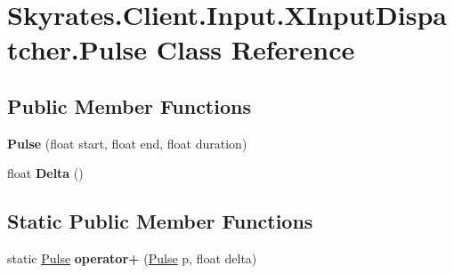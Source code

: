 \hypertarget{class_skyrates_1_1_client_1_1_input_1_1_x_input_dispatcher_1_1_pulse}{\section{Skyrates.\-Client.\-Input.\-X\-Input\-Dispatcher.\-Pulse Class Reference}
\label{class_skyrates_1_1_client_1_1_input_1_1_x_input_dispatcher_1_1_pulse}
}
\subsection*{Public Member Functions}
\begin{DoxyCompactItemize}
\item 
\hypertarget{class_skyrates_1_1_client_1_1_input_1_1_x_input_dispatcher_1_1_pulse_abf14fbb7ce803f1dd780a0671734487f}{{\bfseries Pulse} (float start, float end, float duration)}\label{class_skyrates_1_1_client_1_1_input_1_1_x_input_dispatcher_1_1_pulse_abf14fbb7ce803f1dd780a0671734487f}

\item 
\hypertarget{class_skyrates_1_1_client_1_1_input_1_1_x_input_dispatcher_1_1_pulse_ae679dbddb9756d6b224c1ec0ba0d591a}{float {\bfseries Delta} ()}\label{class_skyrates_1_1_client_1_1_input_1_1_x_input_dispatcher_1_1_pulse_ae679dbddb9756d6b224c1ec0ba0d591a}

\end{DoxyCompactItemize}
\subsection*{Static Public Member Functions}
\begin{DoxyCompactItemize}
\item 
\hypertarget{class_skyrates_1_1_client_1_1_input_1_1_x_input_dispatcher_1_1_pulse_a68f37330b43dfda088b3d9ecf386cd4d}{static \hyperlink{class_skyrates_1_1_client_1_1_input_1_1_x_input_dispatcher_1_1_pulse}{Pulse} {\bfseries operator+} (\hyperlink{class_skyrates_1_1_client_1_1_input_1_1_x_input_dispatcher_1_1_pulse}{Pulse} p, float delta)}\label{class_skyrates_1_1_client_1_1_input_1_1_x_input_dispatcher_1_1_pulse_a68f37330b43dfda088b3d9ecf386cd4d}

\end{DoxyCompactItemize}
